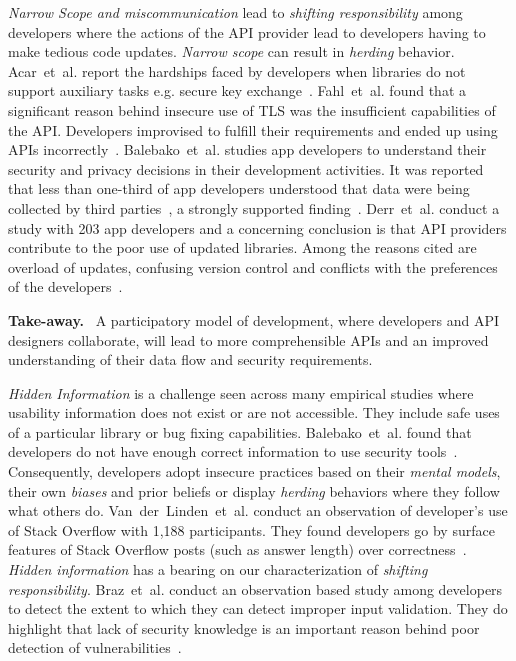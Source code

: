 \documentclass[conference]{IEEEtran}
\newenvironment{finding}{\begin{framed}\noindent\textbf{Take-away.}~}{\end{framed}}
\newcommand{\etal}[0]{et~al{.}}
\begin{document}
\emph{{Narrow Scope} and {miscommunication}} lead to \emph{shifting responsibility} among developers where the actions of the API provider lead to developers having to make tedious code updates. \emph{Narrow scope} can result in \emph{herding} behavior. Acar~\etal{} report the hardships faced by developers when libraries do not support auxiliary tasks e.g. secure key exchange~\cite{acarusability2017}. Fahl~\etal{} found that a significant reason behind insecure use of TLS was the insufficient capabilities of the API. Developers improvised to fulfill their requirements and ended up using APIs incorrectly~\cite{fahl2012}. Balebako~\etal{} studies app developers to understand their security and privacy decisions in their development activities. It was reported that less than one-third of app developers understood that data were being collected by third parties~\cite{balebako2014}, a strongly supported finding~\cite{votipka2020,jain2014,hadar2018}. Derr~\etal{} conduct a study with 203 app developers and a concerning conclusion is that API providers contribute to the poor use of updated libraries. Among the reasons cited are overload of updates, confusing version control and conflicts with the preferences of the developers~\cite{erikacar2017,acar2016}. 
\begin{finding}
 \noindent  
 A participatory model of development, where developers and API designers collaborate, will lead to more comprehensible APIs and an improved understanding of their data flow and security requirements.
\end{finding}

\emph{Hidden Information} is a challenge seen across many empirical studies where usability information does not exist or are not accessible. They include safe uses of a particular library or bug fixing capabilities. Balebako~\etal{} found that developers do not have enough correct information to use security tools~\cite{balebako2014}. Consequently, developers adopt insecure practices based on their \emph{mental models}, their own \emph{biases} and prior beliefs or display \emph{herding} behaviors where they follow what others do. Van~der~Linden~\etal{} conduct an observation of developer's use of Stack Overflow with 1,188 participants. They found developers go by surface features of Stack Overflow posts (such as answer length) over correctness~\cite{emmasurface2020}. \emph{Hidden information} has a bearing on our characterization of \emph{shifting responsibility}. Braz~\etal{} conduct an observation based study among developers to detect the extent to which they can detect improper input validation. They do highlight that lack of security knowledge is an important reason behind poor detection of vulnerabilities~\cite{braz2021}. 
\end{document}
